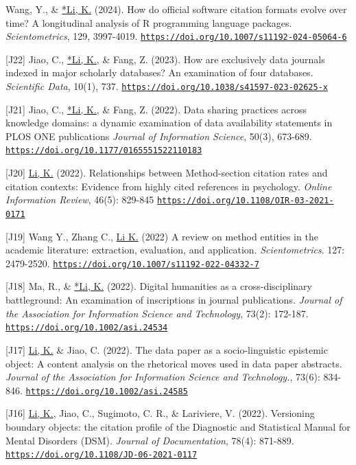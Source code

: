 \documentclass[margin, 10pt]{res} %
\begin{document}
\begin{resume}
[J23] Wang, Y., \& \underline{*Li, K.} (2024). How do official software citation formats evolve over time? A longitudinal analysis of R programming language packages. \textit{Scientometrics}, 129, 3997-4019. \href{https://doi.org/10.1007/s11192-024-05064-6}{\nolinkurl{https://doi.org/10.1007/s11192-024-05064-6}}

[J22] Jiao, C., \underline{*Li, K.}, \& Fang, Z. (2023). How are exclusively data journals indexed in major scholarly databases? An examination of four databases. \textit{Scientific Data}, 10(1), 737. \href{https://doi.org/10.1038/s41597-023-02625-x}{\nolinkurl{https://doi.org/10.1038/s41597-023-02625-x}}

[J21] Jiao, C., \underline{*Li, K.}, \& Fang, Z. (2022). Data sharing practices across knowledge domains: a dynamic examination of data availability statements in PLOS ONE publications \textit{Journal of Information Science}, 50(3), 673-689. \href{https://doi.org/10.1177/0165551522110183}{\nolinkurl{https://doi.org/10.1177/0165551522110183}} 

[J20] \underline{Li, K.} (2022). Relationships between Method-section citation rates and citation contexts: Evidence from highly cited references in psychology. \textit{Online Information Review}, 46(5): 829-845 \href{https://doi.org/10.1108/OIR-03-2021-0171}{\nolinkurl{https://doi.org/10.1108/OIR-03-2021-0171}} 

[J19] Wang Y., Zhang C., \underline{Li K.} (2022) A review on method entities in the academic literature: extraction, evaluation, and application. \textit{Scientometrics}. 127: 2479-2520. \href{https://doi.org/10.1007/s11192-022-04332-7}{\nolinkurl{https://doi.org/10.1007/s11192-022-04332-7}}

[J18] Ma, R., \& \underline{*Li, K.} (2022). Digital humanities as a cross-disciplinary battleground: An examination of inscriptions in journal publications. \textit{Journal of the Association for Information Science and Technology}, 73(2): 172-187. \href{https://doi.org/10.1002/asi.24534}{\nolinkurl{https://doi.org/10.1002/asi.24534}}

[J17] \underline{Li, K.} \& Jiao, C. (2022). The data paper as a socio-linguistic epistemic object: A content analysis on the rhetorical moves used in data paper abstracts. \textit{Journal of the Association for Information Science and Technology.}, 73(6): 834-846. \href{https://doi.org/10.1002/asi.24585}{\nolinkurl{https://doi.org/10.1002/asi.24585}}

[J16] \underline{Li, K.}, Jiao, C., Sugimoto, C. R., \& Lariviere, V. (2022). Versioning boundary objects: the citation profile of the Diagnostic and Statistical Manual for Mental Disorders (DSM). \textit{Journal of Documentation}, 78(4): 871-889. \href{https://doi.org/10.1108/JD-06-2021-0117}{\nolinkurl{https://doi.org/10.1108/JD-06-2021-0117}}


\end{resume}
\end{document}
